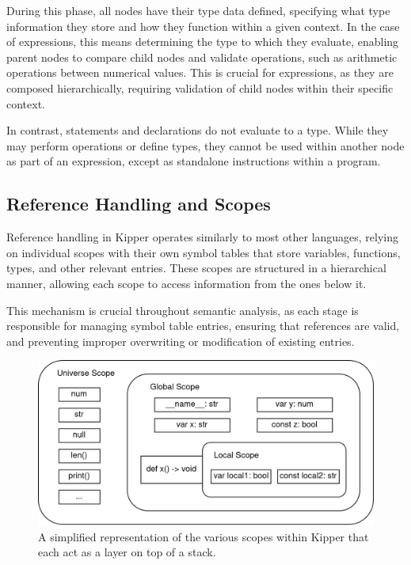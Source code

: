 During this phase, all nodes have their type data defined, specifying what type information they store and how they function within a given context. In the case of expressions, this means determining the type to which they evaluate, enabling parent nodes to compare child nodes and validate operations, such as arithmetic operations between numerical values. This is crucial for expressions, as they are composed hierarchically, requiring validation of child nodes within their specific context.

In contrast, statements and declarations do not evaluate to a type. While they may perform operations or define types, they cannot be used within another node as part of an expression, except as standalone instructions within a program.

\subsection{Reference Handling and Scopes}
\label{sec:reference-handling-and-scopes}

Reference handling in Kipper operates similarly to most other languages, relying on individual scopes with their own symbol tables that store variables, functions, types, and other relevant entries. These scopes are structured in a hierarchical manner, allowing each scope to access information from the ones below it.

This mechanism is crucial throughout semantic analysis, as each stage is responsible for managing symbol table entries, ensuring that references are valid, and preventing improper overwriting or modification of existing entries.

 \begin{figure}[h!]
	\centering
	\includegraphics[scale=1]{./pics/Kipper-Scopes.drawio}
	\caption{A simplified representation of the various scopes within Kipper that each act as a layer on top of a stack.}
	\label{fig:implementation:kipper-scopes}
\end{figure}

